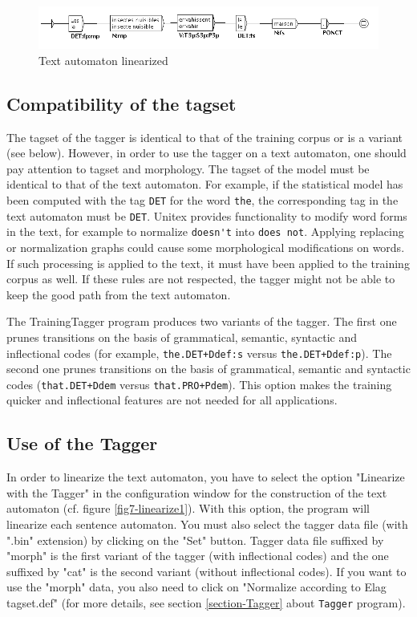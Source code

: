 \begin{figure}[!ht]
\begin{center}
\includegraphics[width=16cm]{resources/img/fig7-linearize3.png}
\caption{Text automaton linearized\label{fig7-linearize3}}
\end{center}
\end{figure}

\subsection{Compatibility of the tagset}
\label{section-linearization-tagset}

The tagset of the tagger is identical to that of the training corpus or is a variant (see below). However, in order to use the tagger 
on a text automaton, one should pay attention to tagset and morphology. The tagset of the model must be identical to that of the text automaton. For example, if the statistical model has been computed with the tag \verb+DET+ for the word \verb+the+, 
the corresponding tag in the text automaton must be \verb+DET+. Unitex provides functionality to modify word forms in the text, for example to normalize \verb+doesn't+ into \verb+does not+.
Applying replacing or normalization graphs could cause some morphological modifications on words.
If such processing is applied to the text, it must have been applied to the training corpus as well. 
If these rules are not respected, the tagger might not be able to keep the good path from the text automaton.

\bigskip
\noindent The TrainingTagger program produces two variants of the tagger. The first one prunes transitions on the basis of 
grammatical, semantic, syntactic and inflectional codes (for example, \verb$the.DET+Ddef:s$ versus \verb$the.DET+Ddef:p$). 
The second one prunes transitions on the basis of grammatical, semantic and syntactic codes (\verb$that.DET+Ddem$ versus 
\newline \verb$that.PRO+Pdem$). This option makes the training quicker and inflectional features are not needed
for all applications.

\subsection{Use of the Tagger}
In order to linearize the text automaton, you have to select the option "Linearize with the Tagger" 
in the configuration window for the construction of the text automaton (cf. figure \ref{fig7-linearize1}). 
With this option, the program will linearize each sentence automaton. 
You must also select the tagger data file (with ".bin" extension) by clicking on the "Set" button.
Tagger data file suffixed by "morph" is the first variant of the tagger (with inflectional codes) and 
the one suffixed by "cat" is the second variant (without inflectional codes). 
If you want to use the "morph" data, you also need to click on "Normalize according to Elag 
tagset.def" (for more details, see section \ref{section-Tagger} about \verb+Tagger+ program).

